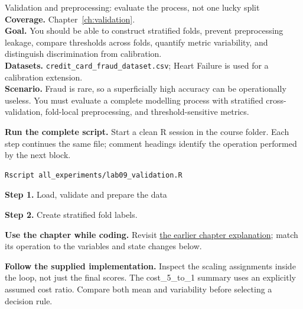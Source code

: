 
\begin{labproject}{Validation and preprocessing: evaluate the process, not one lucky split}
\textbf{Coverage.} Chapter~\ref{ch:validation}.\\
\textbf{Goal.} You should be able to construct stratified folds, prevent preprocessing leakage, compare thresholds across folds, quantify metric variability, and distinguish discrimination from calibration.\\
\textbf{Datasets.} \texttt{credit\_card\_fraud\_dataset.csv}; Heart Failure is used for a calibration extension.\\
\textbf{Scenario.} Fraud is rare, so a superficially high accuracy can be operationally useless. You must evaluate a complete modelling process with stratified cross-validation, fold-local preprocessing, and threshold-sensitive metrics.



\textbf{Run the complete script.} Start a clean R session in the course folder. Each step continues the same file; comment headings identify the operation performed by the next block.
\begin{lstlisting}[style=utpterminal]
Rscript all_experiments/lab09_validation.R
\end{lstlisting}

\noindent\textbf{Step 1.} Load, validate and prepare the data


\noindent\textbf{Step 2.} Create stratified fold labels.




\textbf{Use the chapter while coding.} Revisit \hyperref[ch:validation]{the earlier chapter explanation}; match its operation to the variables and state changes below.

\textbf{Follow the supplied implementation.} Inspect the scaling assignments inside the loop, not just the final scores. The cost\_5\_to\_1 summary uses an explicitly assumed cost ratio. Compare both mean and variability before selecting a decision rule.






\end{labproject}
